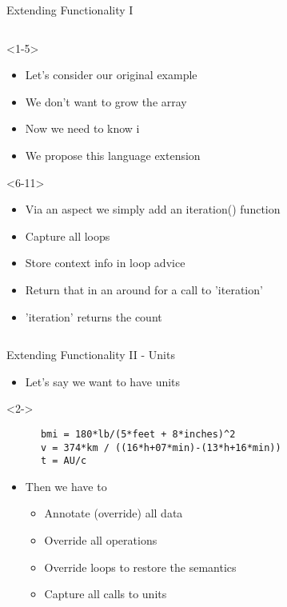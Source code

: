 \begin{frame}[fragile,t]{Extending Functionality I}
\begin{columns}[T]
      \begin{column}{5cm}
        \begin{onlyenv}<1-5>
          \begin{itemize}
          \item<1-5> Let's consider our original example
          \item<2-5> We don't want to grow the array
          \item<4-5> Now we need to know i
          \item<5> We propose this language extension 
          \end{itemize}
        \end{onlyenv}
        \begin{onlyenv}<6-11>
          \begin{itemize}
          \item<6-> Via an aspect we simply add an iteration() function
          \item<7-> Capture all loops
          \item<8-> Store context info in loop advice 
           \item<9-> Return that in an around for a call to 'iteration'
          \item<10> 'iteration' returns the count
          \end{itemize}
        \end{onlyenv}
    \end{column}
  \end{columns}
\end{frame}




\begin{frame}[fragile,t]{Extending Functionality II - Units}
  \begin{itemize}
  \item Let's say we want to have units
  \end{itemize}
  \begin{onlyenv}<2->
    \begin{Verbatim}
      bmi = 180*lb/(5*feet + 8*inches)^2
      v = 374*km / ((16*h+07*min)-(13*h+16*min))
      t = AU/c
    \end{Verbatim}
  \end{onlyenv}
  \begin{itemize}
    \pause
    \pause \item Then we have to
    \begin{itemize}
      \pause \item Annotate (override) all data
      \pause \item Override all operations
      \pause \item Override loops to restore the semantics
      \pause \item Capture all calls to units
    \end{itemize}
  \end{itemize}
\end{frame}


